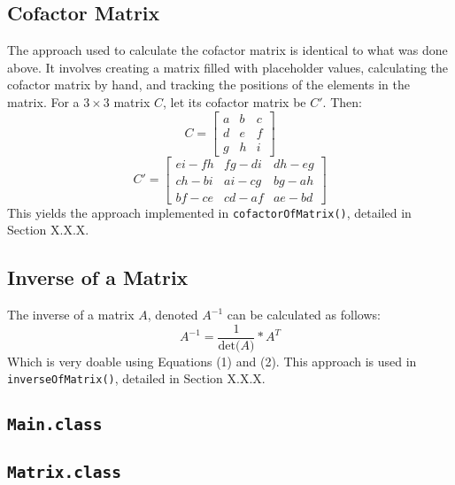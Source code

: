 \documentclass[12pt]{article}
\begin{document}
\subsection{Cofactor Matrix}
The approach used to calculate the cofactor matrix is identical to what was done above. It involves creating a matrix filled with placeholder values, calculating the cofactor matrix by hand, and tracking the positions of the elements in the matrix. For a $3\times3$ matrix $C$, let its cofactor matrix be $C'$. Then:
\[
C =
\begin{bmatrix}
    a & b & c \\
    d & e & f \\
    g & h & i
\end{bmatrix}
\]
\begin{equation}
C' =
    \begin{bmatrix}
    e i - f h & f g - d i & d h - e g \\
    c h - b i & a i - c g & b g - a h \\
    b f - c e & c d - a f & a e - b d
\end{bmatrix}
\end{equation}
This yields the approach implemented in \texttt{cofactorOfMatrix()}, detailed in Section X.X.X.

\subsection{Inverse of a Matrix}
The inverse of a matrix $A$, denoted $A^{-1}$ can be calculated as follows:
\begin{equation}
    A^{-1} = \frac{1}{\text{det($A$)}} * A^T
\end{equation}
Which is very doable using Equations (1) and (2). This approach is used in \texttt{inverseOfMatrix()}, detailed in Section X.X.X.



\newpage %



\begin{center}
\section{\texttt{Main.class}}
\end{center}



\newpage %



\begin{center}
\section{\texttt{Matrix.class}}
\end{center}
\end{document}
